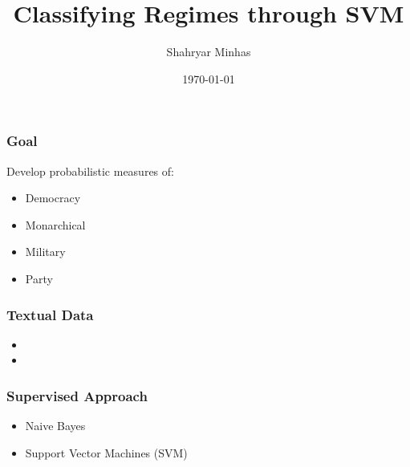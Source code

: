 \documentclass{beamer}
\title[Regime Classification \hspace{14em} \insertframenumber/
\inserttotalframenumber]{Classifying Regimes through SVM}
\author{Shahryar Minhas}
\institute[Duke University]
{
{\emph{sfm12@duke.edu}} \\
\medskip
Duke University 
}
\date{\today}
\begin{document}
\begin{frame}
\titlepage
\end{frame}

\begin{frame}
\frametitle{Goal}

Develop probabilistic measures of:

\begin{itemize}
	\item Democracy
	\item Monarchical
	\item Military
	\item Party
\end{itemize}

\end{frame}

\begin{frame}
\frametitle{Textual Data}
\scriptsize{
	\begin{itemize}
		\item 
		\item 
	\end{itemize}
	}
\end{frame}

\begin{frame}
\frametitle{Supervised Approach}

\begin{itemize}
	\item Naive Bayes
	\item Support Vector Machines (SVM)
\end{itemize}

\end{frame}
\end{document}
